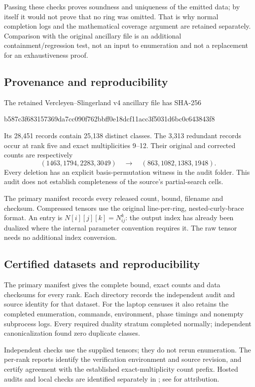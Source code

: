 \documentclass[11pt,a4paper]{article}
\theoremstyle{definition}\newtheorem{definition}[theorem]{Definition}\newtheorem{remark}[theorem]{Remark}
\begin{document}
Passing these checks proves soundness and uniqueness of the emitted data; by
itself it would not prove that no ring was omitted. That is why normal completion
logs and the mathematical coverage argument are retained separately. Comparison
with the original ancillary file is an additional containment/regression test,
not an input to enumeration and not a replacement for an exhaustiveness proof.

\subsection{Provenance and reproducibility}
The retained Vercleyen--Slingerland v4 ancillary file has SHA-256
\begin{center}\footnotesize\ttfamily
b587c3f683157369da7cc090f762bbff0e18dcf11acc3f5031d6bc0c643843f8
\end{center}
Its 28,451 records contain 25,138 distinct classes. The 3,313 redundant records
occur at rank five and exact multiplicities 9--12. Their original and corrected
counts are respectively
\[
(1463,1794,2283,3049)\quad\longrightarrow\quad(863,1082,1383,1948).
\]
Every deletion has an explicit basis-permutation witness in the audit folder.
This audit does not establish completeness of the source's partial-search cells.

The primary manifest  records every released count,
bound, filename and checksum. Compressed tensors use the original line-per-ring,
nested-curly-brace format. An entry is $N[i][j][k]=N_{ij}^{k}$: the output index
has already been dualized where the internal parameter convention requires it.
The raw tensor needs no additional index conversion.

\subsection{Certified datasets and reproducibility}
The primary manifest gives the complete bound, exact counts and data checksums
for every rank. Each  directory records the independent
audit and source identity for that dataset. For the laptop censuses it also
retains the completed enumeration, commands, environment, phase timings and
nonempty subprocess logs. Every required duality stratum completed normally;
independent canonicalization found zero duplicate classes.

Independent checks use the supplied tensors; they do not rerun enumeration.
The per-rank reports identify the verification environment and source revision,
and certify agreement with the established exact-multiplicity count prefix.
Hosted audits and local checks are identified separately in
; see  for attribution.
\end{document}
